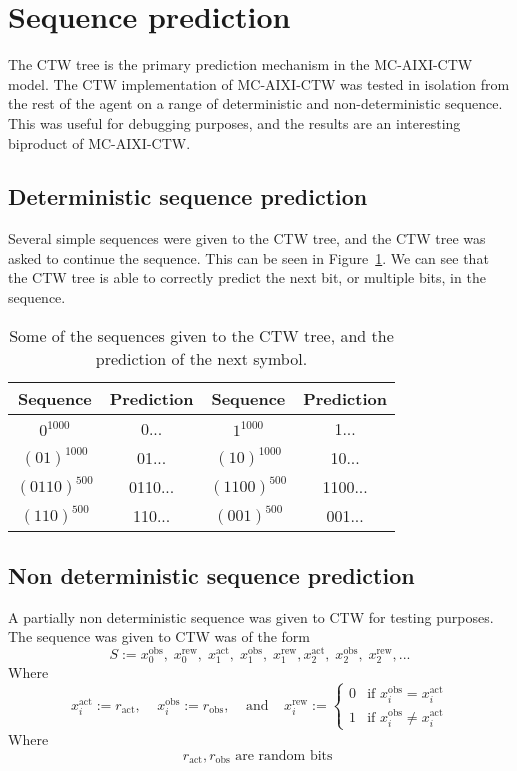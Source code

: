 \documentclass[pdftex,twoside,a4paper]{report}
\newcommand{\bcen}{\begin{center}}
\newcommand{\ecen}{\end{center}}
\newcommand{\mac}{MC-AIXI-CTW}
\begin{document}
\section{Sequence prediction}
\label{sec:Sequence prediction}
The CTW tree is the primary prediction mechanism in the \mac{} model. The CTW implementation of \mac{} was tested in isolation from the rest of the agent on a range of deterministic and non-deterministic sequence. This was useful for debugging purposes, and the results are an interesting biproduct of \mac{}.
\subsection{Deterministic sequence prediction}
Several simple sequences were given to the CTW tree, and the CTW tree was asked to continue the sequence. This can be seen in Figure~\ref{tab:det_seq_pred}. We can see that the CTW tree is able to correctly predict the next bit, or multiple bits, in the sequence.

\begin{table}
\bcen
\bgroup
\def\arraystretch{1.5}
\begin{tabular}{|cc|cc|}
\hline
Sequence & Prediction & Sequence & Prediction\\
\hline $0^{1000}$ & 0... & $1^{1000}$ & 1...\\ 
\hline $(01)^{1000}$ & 01... & $(10)^{1000}$ & 10...\\ 
\hline $(0110)^{500}$ & 0110... & $(1100)^{500}$ & 1100...\\ 
\hline $(110)^{500}$ & 110... & $(001)^{500}$ & 001...\\
\hline 
\end{tabular} 
\egroup
\ecen
\caption{Some of the sequences given to the CTW tree, and the prediction of the next symbol.}
\label{tab:det_seq_pred}
\end{table}

\subsection{Non deterministic sequence prediction}
A partially non deterministic sequence was given to CTW for testing purposes. The sequence was given to CTW was of the form\\
\[
S := x^{\text{obs}}_0,\; x^{\text{rew}}_0,\; x^{\text{act}}_1,\; x^{\text{obs}}_1,\; x^{\text{rew}}_1, x^{\text{act}}_2,\; x^{\text{obs}}_2,\; x^{\text{rew}}_2, ...
\]
Where\\
\[
x^{\text{act}}_i := r_{\text{act}}, \;\;\;\; x^{\text{obs}}_i := r_{\text{obs}}, \;\;\;\; \text{and} \;\;\;\;
x^{\text{rew}}_i :=
\begin{cases}
0 & \text{if } x^{\text{obs}}_i = x^{\text{act}}_i\\
1 & \text{if } x^{\text{obs}}_i \not= x^{\text{act}}_i
\end{cases}
\]
Where\\
\[
r_\text{act}, r_\text{obs} \text{ are random bits }
\]
\end{document}
